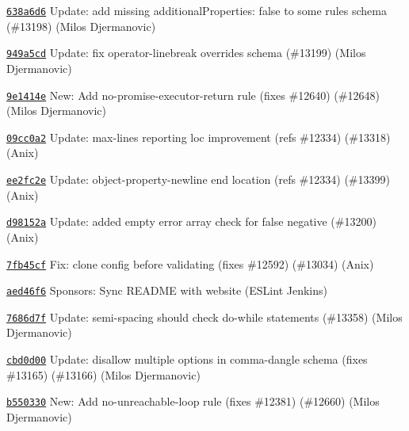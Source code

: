 \begin{DoxyItemize}
\item \href{https://github.com/eslint/eslint/commit/638a6d6be18b4a37cfdc7223e1f5acd3718694be}{\texttt{ {\ttfamily 638a6d6}}} Update\+: add missing {\ttfamily additional\+Properties\+: false} to some rules\textquotesingle{} schema (\#13198) (Milos Djermanovic)
\item \href{https://github.com/eslint/eslint/commit/949a5cd741c2e930cfb43d80a9b6b084f9d677c3}{\texttt{ {\ttfamily 949a5cd}}} Update\+: fix operator-\/linebreak overrides schema (\#13199) (Milos Djermanovic)
\item \href{https://github.com/eslint/eslint/commit/9e1414ee16b8caf582920f8fdf3b6ee1eb0b7cd5}{\texttt{ {\ttfamily 9e1414e}}} New\+: Add no-\/promise-\/executor-\/return rule (fixes \#12640) (\#12648) (Milos Djermanovic)
\item \href{https://github.com/eslint/eslint/commit/09cc0a2bb5bcf3bcb0766a3c989871f268518437}{\texttt{ {\ttfamily 09cc0a2}}} Update\+: max-\/lines reporting loc improvement (refs \#12334) (\#13318) (Anix)
\item \href{https://github.com/eslint/eslint/commit/ee2fc2e90d0f9dfcdba852b0609156bee5280b92}{\texttt{ {\ttfamily ee2fc2e}}} Update\+: object-\/property-\/newline end location (refs \#12334) (\#13399) (Anix)
\item \href{https://github.com/eslint/eslint/commit/d98152a3d8c72e4f5ac4c6fa10a615b12090c8f7}{\texttt{ {\ttfamily d98152a}}} Update\+: added empty error array check for false negative (\#13200) (Anix)
\item \href{https://github.com/eslint/eslint/commit/7fb45cf13e9908d489bd6d5fba3b7243c01508b9}{\texttt{ {\ttfamily 7fb45cf}}} Fix\+: clone config before validating (fixes \#12592) (\#13034) (Anix)
\item \href{https://github.com/eslint/eslint/commit/aed46f69d54da167d9838149954ceeb4b02be5fd}{\texttt{ {\ttfamily aed46f6}}} Sponsors\+: Sync README with website (ESLint Jenkins)
\item \href{https://github.com/eslint/eslint/commit/7686d7feaccc7b8fee927eda6602d641d8de1e5c}{\texttt{ {\ttfamily 7686d7f}}} Update\+: semi-\/spacing should check do-\/while statements (\#13358) (Milos Djermanovic)
\item \href{https://github.com/eslint/eslint/commit/cbd0d00a1ec2824d7e025bbbc084855ed0bf08bb}{\texttt{ {\ttfamily cbd0d00}}} Update\+: disallow multiple options in comma-\/dangle schema (fixes \#13165) (\#13166) (Milos Djermanovic)
\item \href{https://github.com/eslint/eslint/commit/b550330d739c73a7a8f887064e7c911d05a95f9a}{\texttt{ {\ttfamily b550330}}} New\+: Add no-\/unreachable-\/loop rule (fixes \#12381) (\#12660) (Milos Djermanovic)

\end{DoxyItemize}
